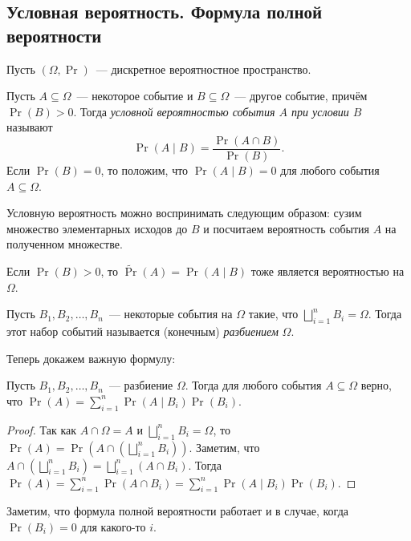 \subsection{Условная вероятность. Формула полной вероятности}
Пусть \((\Omega, \Pr)\)~--- дискретное вероятностное пространство.
\begin{definition}
    Пусть \(A \subseteq \Omega\)~--- некоторое событие и \(B \subseteq \Omega\)~--- другое событие, причём \(\Pr(B) > 0\). Тогда \emph{условной вероятностью события \(A\) при условии \(B\)} называют \[\Pr(A \mid B) = \dfrac{\Pr(A \cap B)}{\Pr(B)}.\]
    Если \(\Pr(B) = 0\), то положим, что \(\Pr(A \mid B) = 0\) для любого события \(A \subseteq \Omega\).
\end{definition}
Условную вероятность можно воспринимать следующим образом: сузим множество элементарных исходов до \(B\) и посчитаем вероятность события \(A\) на полученном множестве.
\begin{remark}
    Если \(\Pr(B) > 0\), то \(\tilde{\Pr}(A) = \Pr(A \mid B)\) тоже является вероятностью на \(\Omega\).
\end{remark}
\begin{definition}
    Пусть \(B_1, B_2, \ldots, B_n\)~--- некоторые события на \(\Omega\) такие, что \(\bigsqcup\limits_{i = 1}^{n} B_i = \Omega\). Тогда этот набор событий называется (конечным) \emph{разбиением} \(\Omega\).
\end{definition}
Теперь докажем важную формулу:
\begin{law-of-total-probability}
    Пусть \(B_1, B_2, \ldots, B_n\)~--- разбиение \(\Omega\). Тогда для любого события \(A \subseteq \Omega\) верно, что \(\Pr(A) = \sum\limits_{i = 1}^{n} \Pr(A \mid B_i)\Pr(B_i).\)
\end{law-of-total-probability}
\begin{proof}
    Так как \(A \cap \Omega = A\) и \(\bigsqcup\limits_{i = 1}^{n} B_i = \Omega\), то \(\Pr(A) = \Pr\left(A \cap \left(\bigsqcup\limits_{i = 1}^{n} B_i\right)\right)\). Заметим, что \(A \cap \left(\bigsqcup\limits_{i = 1}^{n} B_i\right) = \bigsqcup\limits_{i = 1}^{n} (A \cap B_i)\). Тогда
    \(\Pr(A) = \sum\limits_{i = 1}^{n} \Pr(A \cap B_i) = \sum\limits_{i = 1}^{n} \Pr(A \mid B_i)\Pr(B_i)\).
\end{proof}
Заметим, что формула полной вероятности работает и в случае, когда \(\Pr(B_i) = 0\) для какого-то \(i\).